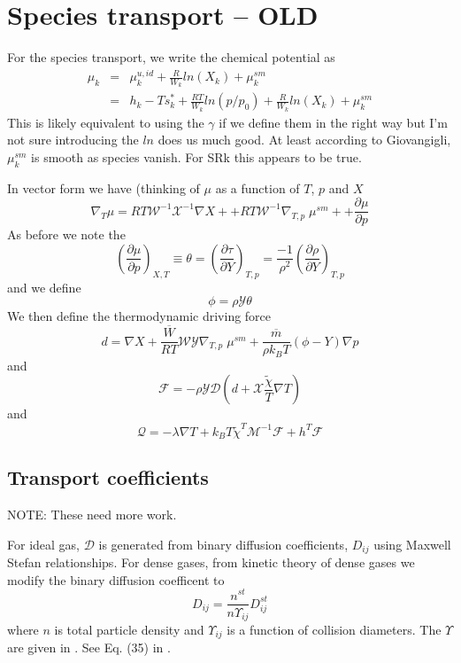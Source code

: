 \documentclass[11pt]{article}
\newcommand{\MarginPar}[1]{\marginpar{%
\vskip-\baselineskip %
\raggedright\tiny\sffamily
\hrule\smallskip{\color{red}#1}\par\smallskip\hrule}}
\newcommand{\HeatFlux}{\boldsymbol{\mathcal{Q}}}
\newcommand{\SpeciesFlux}{\boldsymbol{\mathcal{F}}}
\newcommand{\mbar}{\overline{m}}
\begin{document}
\section{Species transport -- OLD}
\MarginPar{need to fix this}

For the species transport, we write the chemical potential as
\begin{eqnarray}
\label{eq:muk_sm}
\mu_k &=& \mu_k^{u,id} + \frac{R}{W_k} ln(X_k)  +  \mu_k^{sm} \\
 &=& h_k - T s_k^* + \frac{R T}{W_k} ln(p/p_0) + \frac{R}{W_k} ln(X_k) + \mu_k^{sm}
\end{eqnarray}
This is likely equivalent to using the $\gamma$ if we define them in the right way but I'm not sure
introducing the $ln$ does us much good.
At least according to Giovangigli, $\mu_k^{sm}$ is smooth as species vanish.  For SRk this appears to be true.

In vector form we have (thinking of $\mu$ as a function of $T$, $p$ and $X$
\begin{equation}
\nabla_T \mu
= R T \mathcal{W}^{-1} \mathcal{X}^{-1} \nabla X +
+ R T \mathcal{W}^{-1} \nabla_{T,p} \; \mu^{sm} +
+ \frac{\partial \mu}{\partial p}
\end{equation}
As before we note the
\[
\left(\frac{\partial \mu}{\partial p}\right)_{X,T} \equiv \theta = \left(\frac{ \partial \tau}{\partial Y}\right)_{T,p}
 =
\frac{-1}{\rho^2}\left (\frac{\partial \rho}{\partial Y} \right)_{T,p}
\]
and we define
\[
\label{eq:transp_gradp_multiplier}
\phi = \rho \mathcal{Y} \theta
\]
We then define the thermodynamic driving force
\[
d = \nabla X  + \frac{\overline{W}}{R T} \mathcal{W} \mathcal{Y} \nabla_{T,p} \; \mu^{sm}  + \frac{\mbar}{\rho k_B T} (\phi - Y) \nabla p
\]
and
\[
\mathcal{F} = - \rho \mathcal{Y} \mathcal{D} ( d + \mathcal{X} \frac{ \tilde{\chi}}{T} \nabla T)
\]
and
\[
\HeatFlux = - \lambda \nabla T + k_B T {\tilde{\chi}}^T \mathcal{M}^{-1} \SpeciesFlux + h^T \SpeciesFlux
\]

\subsection{Transport coefficients}

NOTE:  These need more work.

For ideal gas, $\mathcal{D}$ is generated from binary diffusion coefficients, $D_{ij}$ using
Maxwell Stefan relationships.
For dense gases, from kinetic theory of dense gases we modify the binary diffusion coefficent to
\[
\label{eq:Dij}
D_{ij} = \frac{n^{st}}{n \Upsilon_{ij}} D_{ij}^{st}
\]
where $n$ is total particle density and $\Upsilon_{ij}$ is a function of collision diameters.
The $\Upsilon$ are given in \cite{KurochkinETAL:1984}.
See Eq. (35) in \cite{giovangigli_CTM:2011}.
\end{document}
